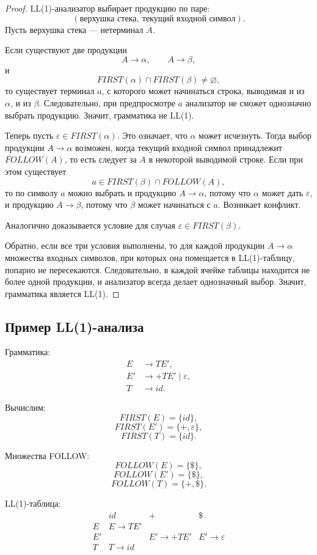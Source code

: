 \documentclass[12pt,a4paper]{article}
\begin{document}
\begin{proof}
LL(1)-анализатор выбирает продукцию по паре:
\[
(\text{верхушка стека},\ \text{текущий входной символ}).
\]
Пусть верхушка стека --- нетерминал $A$.

Если существуют две продукции
\[
A\to\alpha,\qquad A\to\beta,
\]
и
\[
FIRST(\alpha)\cap FIRST(\beta)\ne\varnothing,
\]
то существует терминал $a$, с которого может начинаться строка, выводимая и из $\alpha$, и из $\beta$. Следовательно, при предпросмотре $a$ анализатор не сможет однозначно выбрать продукцию. Значит, грамматика не LL(1).

Теперь пусть $\varepsilon \in FIRST(\alpha)$. Это означает, что $\alpha$ может исчезнуть. Тогда выбор продукции $A\to\alpha$ возможен, когда текущий входной символ принадлежит $FOLLOW(A)$, то есть следует за $A$ в некоторой выводимой строке. Если при этом существует
\[
a \in FIRST(\beta)\cap FOLLOW(A),
\]
то по символу $a$ можно выбрать и продукцию $A\to\alpha$, потому что $\alpha$ может дать $\varepsilon$, и продукцию $A\to\beta$, потому что $\beta$ может начинаться с $a$. Возникает конфликт.

Аналогично доказывается условие для случая $\varepsilon \in FIRST(\beta)$.

Обратно, если все три условия выполнены, то для каждой продукции $A\to\alpha$ множества входных символов, при которых она помещается в LL(1)-таблицу, попарно не пересекаются. Следовательно, в каждой ячейке таблицы находится не более одной продукции, и анализатор всегда делает однозначный выбор. Значит, грамматика является LL(1).
\end{proof}

\subsection{Пример LL(1)-анализа}

Грамматика:
\[
\begin{aligned}
E &\to T E',\\
E' &\to + T E' \mid \varepsilon,\\
T &\to id.
\end{aligned}
\]

Вычислим:
\[
FIRST(E)=\{id\},
\]
\[
FIRST(E')=\{+,\varepsilon\},
\]
\[
FIRST(T)=\{id\}.
\]

Множества FOLLOW:
\[
FOLLOW(E)=\{\$\},
\]
\[
FOLLOW(E')=\{\$\},
\]
\[
FOLLOW(T)=\{+,\$\}.
\]

LL(1)-таблица:
\[
\begin{array}{c|ccc}
 & id & + & \$\\
\hline
E & E\to TE' & & \\
E' & & E'\to +TE' & E'\to \varepsilon\\
T & T\to id & & \\
\end{array}
\]
\end{document}

